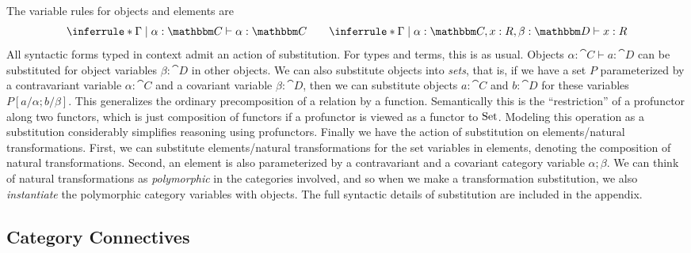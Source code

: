 \documentclass{llncs}
\begin{document}

The variable rules for objects and elements are 
\[
\inferrule*{}{ \Gamma \pipe \alpha : \cat C \vdash \alpha : \cat C}
\qquad
\inferrule*{}{ \Gamma \pipe \alpha : \cat C, x : R, \beta : \cat D \vdash x : R}
\]
All syntactic forms typed in context admit an action of substitution.
For types and terms, this is as usual. Objects $\alpha:\cat C \vdash a :
\cat D$ can be substituted for object variables $\beta : \cat D$ in
other objects. We can also substitute objects into \emph{sets}, that is,
if we have a set $P$ parameterized by a contravariant variable $\alpha :
\cat C$ and a covariant variable $\beta: \cat D$, then we can substitute
objects $a : \cat C$ and $b : \cat D$ for these variables
$P[a/\alpha;b/\beta]$. This generalizes the ordinary precomposition of a
relation by a function.  Semantically this is the ``restriction'' of a
profunctor along two functors, which is just composition of functors if
a profunctor is viewed as a functor to $\textrm{Set}$. Modeling this operation
as a substitution considerably simplifies reasoning using profunctors.
%
Finally we have the action of substitution on elements/natural transformations.
First, we can substitute elements/natural transformations for the set
variables in elements, denoting the composition of natural
transformations.  Second, an element is also parameterized
by a contravariant and a covariant category variable $\alpha;\beta$. We
can think of natural transformations as \emph{polymorphic} in the
categories involved, and so when we make a transformation substitution,
we also \emph{instantiate} the polymorphic category variables with
objects.
%
The full syntactic details of substitution are included in the appendix.

\subsection{Category Connectives}
\end{document}
